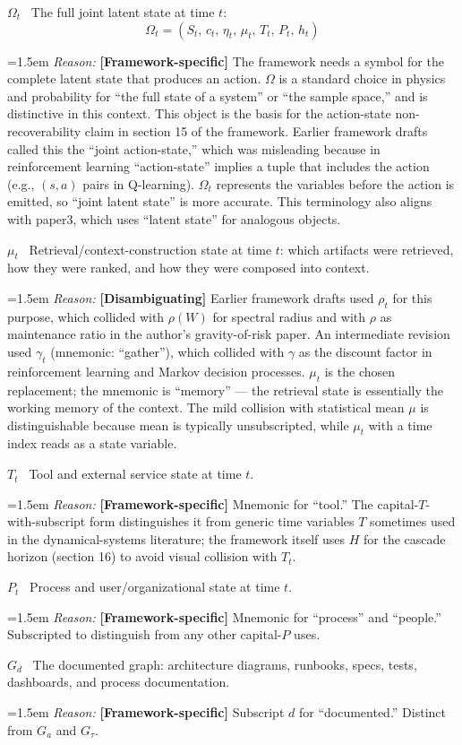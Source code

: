 \documentclass[11pt]{article}
\newcommand{\notation}[2]{%
  \par\smallskip
  \noindent\textbf{#1} \, #2\par
}
\newcommand{\reason}[2]{%
  \par\nopagebreak
  \begingroup
    \leftskip=1.5em
    \sloppy
    \noindent\textit{Reason:} \textbf{[#1]} #2\par
  \endgroup
  \par\smallskip
}
\begin{document}
\notation{$\Omega_t$}{The full joint latent state at time $t$:
\[
\Omega_t = (S_t,\, c_t,\, \eta_t,\, \mu_t,\, T_t,\, P_t,\, h_t)
\]}
\reason{Framework-specific}{The framework needs a symbol for the complete latent state that produces an action. $\Omega$ is a standard choice in physics and probability for ``the full state of a system'' or ``the sample space,'' and is distinctive in this context. This object is the basis for the action-state non-recoverability claim in section 15 of the framework. Earlier framework drafts called this the ``joint action-state,'' which was misleading because in reinforcement learning ``action-state'' implies a tuple that includes the action (e.g., $(s, a)$ pairs in Q-learning). $\Omega_t$ represents the variables before the action is emitted, so ``joint latent state'' is more accurate. This terminology also aligns with paper3, which uses ``latent state'' for analogous objects.}

\notation{$\mu_t$}{Retrieval/context-construction state at time $t$: which artifacts were retrieved, how they were ranked, and how they were composed into context.}
\reason{Disambiguating}{Earlier framework drafts used $\rho_t$ for this purpose, which collided with $\rho(W)$ for spectral radius and with $\rho$ as maintenance ratio in the author's gravity-of-risk paper. An intermediate revision used $\gamma_t$ (mnemonic: ``gather''), which collided with $\gamma$ as the discount factor in reinforcement learning and Markov decision processes. $\mu_t$ is the chosen replacement; the mnemonic is ``memory'' --- the retrieval state is essentially the working memory of the context. The mild collision with statistical mean $\mu$ is distinguishable because mean is typically unsubscripted, while $\mu_t$ with a time index reads as a state variable.}

\notation{$T_t$}{Tool and external service state at time $t$.}
\reason{Framework-specific}{Mnemonic for ``tool.'' The capital-$T$-with-subscript form distinguishes it from generic time variables $T$ sometimes used in the dynamical-systems literature; the framework itself uses $H$ for the cascade horizon (section 16) to avoid visual collision with $T_t$.}

\notation{$P_t$}{Process and user/organizational state at time $t$.}
\reason{Framework-specific}{Mnemonic for ``process'' and ``people.'' Subscripted to distinguish from any other capital-$P$ uses.}

\notation{$G_d$}{The documented graph: architecture diagrams, runbooks, specs, tests, dashboards, and process documentation.}
\reason{Framework-specific}{Subscript $d$ for ``documented.'' Distinct from $G_a$ and $G_\tau$.}
\end{document}

